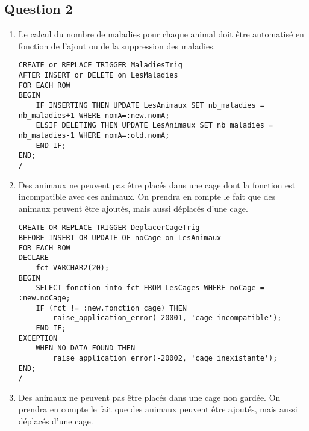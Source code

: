 \documentclass{article}
\begin{document}
\subsection*{Question 2}
\begin{enumerate}[label=\arabic*)]
	\item Le calcul du nombre de maladies pour chaque animal doit être automatisé en fonction de l’ajout
ou de la suppression des maladies.

\lstset{language=SQL}
\begin{lstlisting}
CREATE or REPLACE TRIGGER MaladiesTrig
AFTER INSERT or DELETE on LesMaladies
FOR EACH ROW
BEGIN
	IF INSERTING THEN UPDATE LesAnimaux SET nb_maladies = nb_maladies+1 WHERE nomA=:new.nomA;
	ELSIF DELETING THEN UPDATE LesAnimaux SET nb_maladies = nb_maladies-1 WHERE nomA=:old.nomA;
	END IF;
END;
/
\end{lstlisting}

	\item Des animaux ne peuvent pas être placés dans une cage dont la fonction est incompatible avec
ces animaux. On prendra en compte le fait que des animaux peuvent être ajoutés, mais aussi
déplacés d’une cage.\\

\begin{lstlisting}
CREATE OR REPLACE TRIGGER DeplacerCageTrig
BEFORE INSERT OR UPDATE OF noCage on LesAnimaux
FOR EACH ROW
DECLARE
	fct VARCHAR2(20);
BEGIN
	SELECT fonction into fct FROM LesCages WHERE noCage = :new.noCage;
	IF (fct != :new.fonction_cage) THEN
		raise_application_error(-20001, 'cage incompatible');
	END IF;
EXCEPTION 
	WHEN NO_DATA_FOUND THEN
		raise_application_error(-20002, 'cage inexistante');
END;
/
\end{lstlisting}
	\item Des animaux ne peuvent pas être placés dans une cage non gardée. On prendra en compte le
fait que des animaux peuvent être ajoutés, mais aussi déplacés d’une cage.


\end{enumerate}
\end{document}
